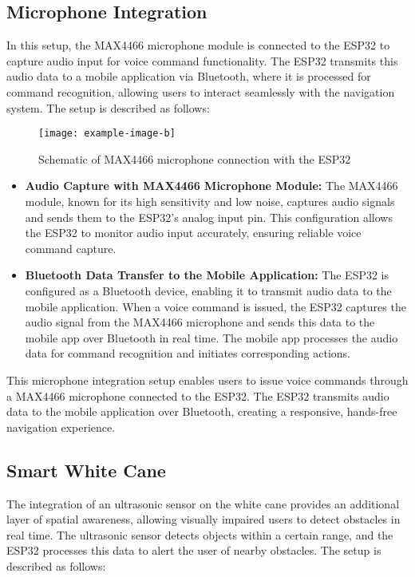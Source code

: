 \subsection{Microphone Integration}

In this setup, the MAX4466 microphone module is connected to the ESP32 to capture audio input for voice command functionality. The ESP32 transmits this audio data to a mobile application via Bluetooth, where it is processed for command recognition, allowing users to interact seamlessly with the navigation system. The setup is described as follows:

\begin{figure}[h!]
	\centering
	\texttt{[image: example-image-b]}
	\caption{Schematic of MAX4466 microphone connection with the ESP32}
	\label{fig:microphone_schematics}
\end{figure}

\begin{itemize}
	\item \textbf{Audio Capture with MAX4466 Microphone Module:} The MAX4466 module, known for its high sensitivity and low noise, captures audio signals and sends them to the ESP32’s analog input pin. This configuration allows the ESP32 to monitor audio input accurately, ensuring reliable voice command capture.
	
	\item \textbf{Bluetooth Data Transfer to the Mobile Application:} The ESP32 is configured as a Bluetooth device, enabling it to transmit audio data to the mobile application. When a voice command is issued, the ESP32 captures the audio signal from the MAX4466 microphone and sends this data to the mobile app over Bluetooth in real time. The mobile app processes the audio data for command recognition and initiates corresponding actions.
	
\end{itemize}

This microphone integration setup enables users to issue voice commands through a MAX4466 microphone connected to the ESP32. The ESP32 transmits audio data to the mobile application over Bluetooth, creating a responsive, hands-free navigation experience.

\subsection{Smart White Cane}

The integration of an ultrasonic sensor on the white cane provides an additional layer of spatial awareness, allowing visually impaired users to detect obstacles in real time. The ultrasonic sensor detects objects within a certain range, and the ESP32 processes this data to alert the user of nearby obstacles. The setup is described as follows:

